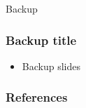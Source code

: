 	
	
	\appendix 
	\begin{frame}
		\begin{center}
			\huge{Backup}
		\end{center}
	\end{frame}
	
	
	\begin{frame}
		\frametitle{Backup title}
		\label{bargmodel}
		\begin{itemize}
			\item Backup slides
		\end{itemize}
	\end{frame}
		
	
	\begin{frame}[allowframebreaks]
		\frametitle{References}
		
		
	\end{frame}
